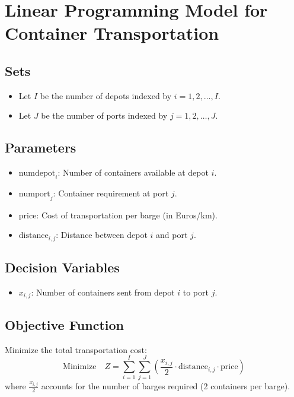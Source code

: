 \documentclass{article}
\begin{document}
\section*{Linear Programming Model for Container Transportation}

\subsection*{Sets}
\begin{itemize}
    \item Let \( I \) be the number of depots indexed by \( i = 1, 2, \ldots, I \).
    \item Let \( J \) be the number of ports indexed by \( j = 1, 2, \ldots, J \).
\end{itemize}

\subsection*{Parameters}
\begin{itemize}
    \item \( \text{numdepot}_i \): Number of containers available at depot \( i \).
    \item \( \text{numport}_j \): Container requirement at port \( j \).
    \item \( \text{price} \): Cost of transportation per barge (in Euros/km).
    \item \( \text{distance}_{i,j} \): Distance between depot \( i \) and port \( j \).
\end{itemize}

\subsection*{Decision Variables}
\begin{itemize}
    \item \( x_{i,j} \): Number of containers sent from depot \( i \) to port \( j \).
\end{itemize}

\subsection*{Objective Function}
Minimize the total transportation cost:
\[
\text{Minimize} \quad Z = \sum_{i=1}^{I} \sum_{j=1}^{J} \left( \frac{x_{i,j}}{2} \cdot \text{distance}_{i,j} \cdot \text{price} \right)
\]
where \( \frac{x_{i,j}}{2} \) accounts for the number of barges required (2 containers per barge).
\end{document}
